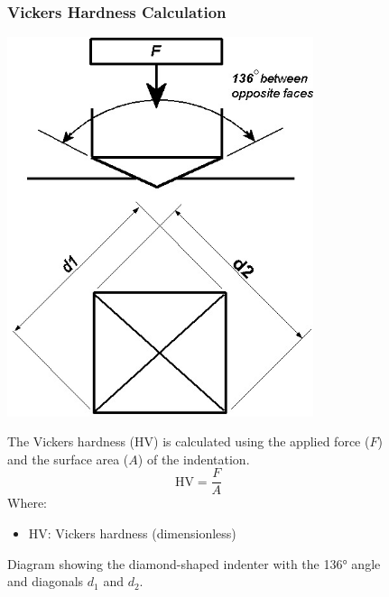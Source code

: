 \documentclass{article}
\begin{document}
    \begin{figure}[H]
        \centering
        \begin{minipage}{0.45\textwidth}
            \vspace{-1em}
            \subsubsection{Vickers Hardness Calculation}\label{VHC}
            
            \centering
            \vspace{2em}\includegraphics[width=0.8\textwidth]{figures/3537580_orig-0000.jpg}
            \caption{Diagram showing the diamond-shaped indenter with the 136° angle and diagonals \(d_1\) and \(d_2\).}
            \label{fig:vickers-diagram}
        \end{minipage}\hfill
        \begin{minipage}{0.51\textwidth}
            The Vickers hardness (HV) is calculated using the applied force (\(F\)) and the surface area (\(A\)) of the indentation. 
            \begin{equation}
                \text{HV} = \frac{F}{A}
            \end{equation}
            Where:
            \begin{itemize}[itemsep=-1mm]
                \item HV: Vickers hardness (dimensionless)

\end{itemize}
\end{minipage}
\end{figure}
\end{document}
